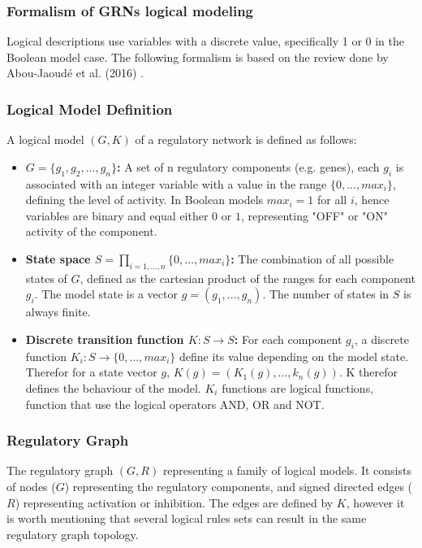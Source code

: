 \subsubsection{Formalism of GRNs logical modeling}
Logical descriptions use variables with a discrete value, specifically 1 or 0 in the Boolean model case. 
The following formalism is based on the review done by Abou-Jaoudé et al. (2016) \cite{abou2016logical}. 

\subsubsection{Logical Model Definition}
A logical model $(G,K)$ of a regulatory network is defined as follows: 
\begin{itemize}
    \item   \textbf{$G = \{g_1, g_2, ...,g_n\}$:} A set of n  regulatory components (e.g. genes), 
        each $g_i$ is associated with an integer variable with a value in the range $\{0,...,max_i\}$, 
        defining the level of activity. In Boolean models $max_i=1$ for all $i$, hence variables are binary and equal either 
        $0$ or $1$, representing "OFF" or "ON" activity of the component.
    \item \textbf{State space $S=\prod_{i=1,...,n}\{0, ...,max_i\}$:} The combination of all possible states of $G$, 
        defined as the cartesian product of the ranges for each component $g_i$.  
        The model state is a vector $g = (g_1,...,g_n)$. The number of states in $S$ is always finite. 
    \item \textbf{Discrete transition function $K: S\rightarrow S$:} For each component $g_i$, a discrete function 
        $K_i: S\rightarrow \{0, ...,max_i\}$ define its value depending on the model state. 
        Therefor for a state vector $g$, $K(g) = (K_1(g),...,k_n(g))$. K therefor defines the behaviour of the model. 
        $K_i$ functions are logical functions, function that use the logical operators AND, OR and NOT. 
\end{itemize}

\subsubsection{Regulatory Graph}
The regulatory graph $(G, R)$ representing a family of logical models. It consists of nodes ($G$) representing the regulatory 
components, and signed directed edges  ($R$) representing activation or inhibition. The edges are defined by $K$, 
however it is worth mentioning that several logical rules sets can result in the same regulatory graph topology. 

